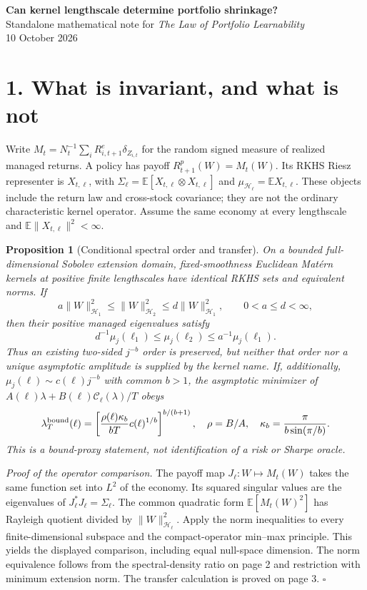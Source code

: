 \documentclass[11pt,letterpaper]{article}
\newtheorem{proposition}{Proposition}
\newcommand{\Hh}{\mathcal H}
\newcommand{\E}{\mathbb E}
\newcommand{\C}{\mathcal C}
\begin{document}
\begin{center}
{\Large\bfseries Can kernel lengthscale determine portfolio shrinkage?}\\[5pt]
{Standalone mathematical note for \emph{The Law of Portfolio Learnability}}\\
10 October 2026
\end{center}

\section*{1. What is invariant, and what is not}
Write $M_t=N_t^{-1}\sum_iR^e_{i,t+1}\delta_{Z_{i,t}}$ for the random signed
measure of realized managed returns. A policy has payoff $R^p_{t+1}(W)=M_t(W)$.
Its RKHS Riesz representer is $X_{t,\ell}$, with
$\Sigma_\ell=\E[X_{t,\ell}\otimes X_{t,\ell}]$ and
$\mu_{\Hh_\ell}=\E X_{t,\ell}$. These objects include the return law and
cross-stock covariance; they are not the ordinary characteristic kernel operator.
Assume the same economy at every lengthscale and $\E\|X_{t,\ell}\|^2<\infty$.

\begin{proposition}[Conditional spectral order and transfer]
On a bounded full-dimensional Sobolev extension domain, fixed-smoothness
Euclidean Mat\'ern kernels at positive finite lengthscales have identical
RKHS sets and equivalent norms. If
\[
 a\|W\|_{\Hh_1}^2\leq\|W\|_{\Hh_2}^2\leq d\|W\|_{\Hh_1}^2,
 \qquad 0<a\leq d<\infty,
\]
then their positive managed eigenvalues satisfy
\[
 d^{-1}\mu_j(\ell_1)\leq\mu_j(\ell_2)\leq a^{-1}\mu_j(\ell_1).
\]
Thus an existing two-sided $j^{-b}$ order is preserved, but neither that
order nor a unique asymptotic amplitude is supplied by the kernel name.
If, additionally, $\mu_j(\ell)\sim c(\ell)j^{-b}$ with common $b>1$, the
asymptotic minimizer of $A(\ell)\lambda+B(\ell)\C_\ell(\lambda)/T$ obeys
\[
 \lambda_T^{\rm bound}(\ell)
 =\left[\frac{\rho(\ell)\kappa_b}{bT}c(\ell)^{1/b}\right]^{b/(b+1)},
 \quad\rho=B/A,\quad\kappa_b=\frac{\pi}{b\sin(\pi/b)}.
\]
This is a bound-proxy statement, not identification of a risk or Sharpe oracle.
\end{proposition}

\textit{Proof of the operator comparison.} The payoff map
$J_\ell:W\mapsto M_t(W)$ takes the same function set into $L^2$ of the
economy. Its squared singular values are the eigenvalues of $J_\ell^*J_\ell=\Sigma_\ell$.
The common quadratic form $\E[M_t(W)^2]$ has Rayleigh quotient divided by
$\|W\|_{\Hh_\ell}^2$. Apply the norm inequalities to every finite-dimensional
subspace and the compact-operator min--max principle. This yields the displayed
comparison, including equal null-space dimension. The norm equivalence follows
from the spectral-density ratio on page 2 and restriction with minimum extension
norm. The transfer calculation is proved on page 3. \hfill$\square$
\end{document}
